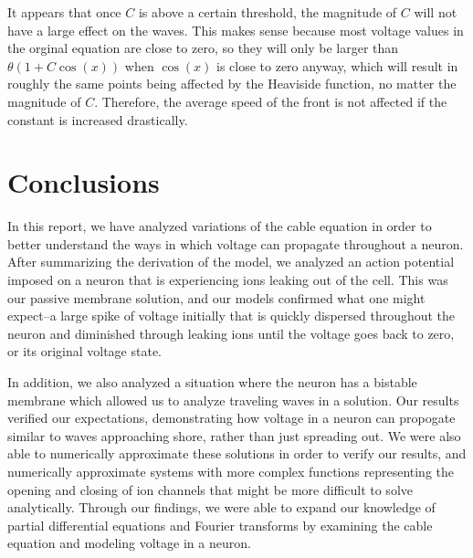 \documentclass[12pt]{article}
\begin{document}
It appears that once $C$ is above a certain threshold, the magnitude of $C$ will not have a large effect on the waves. This makes sense because most voltage values in the orginal equation are close to zero, so they will only be larger than $\theta(1+C\cos(x))$ when $\cos(x)$ is close to zero anyway, which will result in roughly the same points being affected by the Heaviside function, no matter the magnitude of $C$. Therefore, the average speed of the front is not affected if the constant is increased drastically. 

\section{Conclusions}
In this report, we have analyzed variations of the cable equation in order to better understand the ways in which voltage can propagate throughout a neuron. After summarizing the derivation of the model, we analyzed an action potential imposed on a neuron that is experiencing ions leaking out of the cell. This was our passive membrane solution, and our models confirmed what one might expect--a large spike of voltage initially that is quickly dispersed throughout the neuron and diminished through leaking ions until the voltage goes back to zero, or its original voltage state. \par
In addition, we also analyzed a situation where the neuron has a bistable membrane which allowed us to analyze traveling waves in a solution. Our results verified our expectations, demonstrating how voltage in a neuron can propogate similar to waves approaching shore, rather than just spreading out. We were also able to numerically approximate these solutions in order to verify our results, and numerically approximate systems with more complex functions representing the opening and closing of ion channels that might be more difficult to solve analytically. Through our findings, we were able to expand our knowledge of partial differential equations and Fourier transforms by examining the cable equation and modeling voltage in a neuron. 
\end{document}
